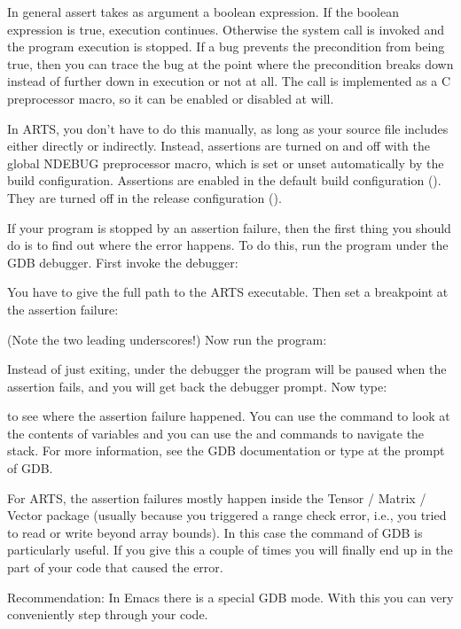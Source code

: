 In general assert takes as argument a boolean expression. If the
boolean expression is true, execution continues. Otherwise the
 system call is invoked and the program execution is
stopped. If a bug prevents the precondition from being true, then you
can trace the bug at the point where the precondition breaks down
instead of further down in execution or not at all.  The  call
is implemented as a C preprocessor macro, so it can be enabled or
disabled at will. 

In ARTS, you don't have to do this manually, as long as your source file
includes  either directly or indirectly. Instead, assertions
are turned on and off with the global NDEBUG preprocessor macro, which is
set or unset automatically by the  build configuration.
Assertions are enabled in the default  build configuration
(). They are turned off in the
release configuration ().

If your program is stopped by an assertion failure, then the first
thing you should do is to find out where the error happens. To do
this, run the program under the GDB debugger. First invoke
the debugger:
\begin{quote}
\end{quote}
You have to give the full path to the ARTS executable.  Then set a
breakpoint at the assertion failure:
\begin{quote}
\end{quote}
(Note the two leading underscores!) Now run the program: 
\begin{quote}
\end{quote}

Instead of just exiting, under the debugger the program will be paused
when the assertion fails, and you will get back the debugger prompt.
Now type:
\begin{quote}
\end{quote}  
to see where the assertion failure happened. You can use the
 command to look at the contents of variables and you
can use the  and  commands to navigate
the stack.  For more information, see the GDB documentation or type
 at the prompt of GDB.

For ARTS, the assertion failures mostly happen inside the Tensor /
Matrix / Vector package (usually because you triggered a range check
error, i.e., you tried to read or write beyond array bounds). In this
case the  command of GDB is particularly useful. If you
give this a couple of times you will finally end up in the part of
your code that caused the error.

Recommendation: In Emacs there is a special GDB mode. With this you
can very conveniently step through your code.




